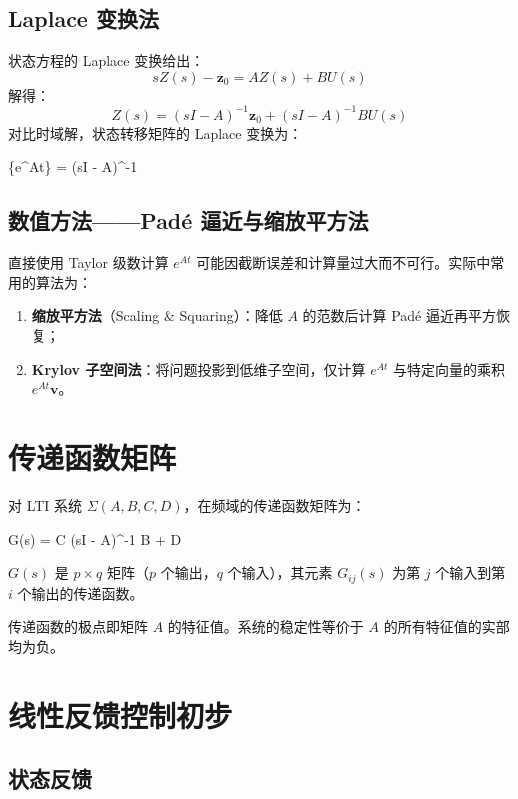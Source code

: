 \subsection{Laplace 变换法}

状态方程的 Laplace 变换给出：
\[
s Z(s) - \mathbf{z}_0 = A Z(s) + B U(s)
\]
解得：
\[
Z(s) = (sI - A)^{-1} \mathbf{z}_0 + (sI - A)^{-1} B U(s)
\]
对比时域解，状态转移矩阵的 Laplace 变换为：
\begin{myformula}
	\{e^{At}\} = (sI - A)^{-1}
\end{myformula}

\subsection{数值方法——Padé 逼近与缩放平方法}

直接使用 Taylor 级数计算 $e^{At}$ 可能因截断误差和计算量过大而不可行。实际中常用的算法为：

\begin{enumerate}
	\item \textbf{缩放平方法}（Scaling \& Squaring）：降低 $A$ 的范数后计算 Padé 逼近再平方恢复；
	\item \textbf{Krylov 子空间法}：将问题投影到低维子空间，仅计算 $e^{At}$ 与特定向量的乘积 $e^{At} \mathbf{v}$。
\end{enumerate}

\section{传递函数矩阵}

对 LTI 系统 $\Sigma(A,B,C,D)$，在频域的传递函数矩阵为：
\begin{myformula}
	G(s) = C (sI - A)^{-1} B + D
\end{myformula}

$G(s)$ 是 $p \times q$ 矩阵（$p$ 个输出，$q$ 个输入），其元素 $G_{ij}(s)$ 为第 $j$ 个输入到第 $i$ 个输出的传递函数。

\begin{remark}
	传递函数的极点即矩阵 $A$ 的特征值。系统的稳定性等价于 $A$ 的所有特征值的实部均为负。
\end{remark}

\section{线性反馈控制初步}

\subsection{状态反馈}

